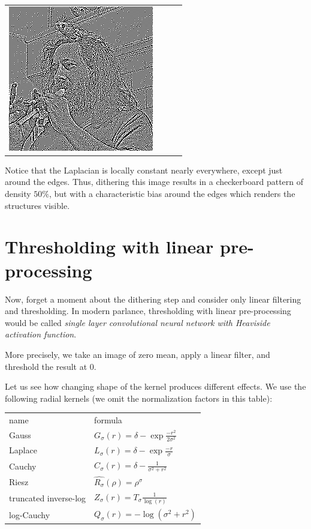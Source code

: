 \begin{tabular}{llll}
	\includegraphics{weiro-diriesz20.png} \\
\end{tabular}

Notice that the Laplacian is locally constant nearly everywhere, except just
around the edges.  Thus, dithering this image results in a checkerboard
pattern of density $50\%$, but with a characteristic bias around the edges
which renders the structures visible.


\section{Thresholding with linear pre-processing}

Now, forget a moment about the dithering step and consider only linear
filtering and thresholding.
In modern parlance, thresholding with linear pre-processing would be called
\emph{single layer convolutional neural network with Heaviside activation
function}.

More precisely, we take an image of zero mean, apply a linear filter, and
threshold the result at 0.


Let us see how changing shape of the kernel produces
different effects.  We use the following radial kernels (we omit the
normalization factors in this table):
\begin{tabular}{ll}
	name & formula \\
	Gauss & $G_\sigma(r) =\delta-\exp\frac{-r^2}{2\sigma^2}$ \\
	Laplace & $L_\sigma(r) =\delta-\exp\frac{-r}{\sigma}$ \\
	Cauchy & $C_\sigma(r) =\delta-\frac{1}{\sigma^2+r^2}$ \\
	Riesz & $\widehat{R_\sigma}(\rho)=\rho^\sigma$ \\
	truncated inverse-log & $Z_\sigma(r)=T_\sigma\frac{1}{\log(r)}$\\
	log-Cauchy & $Q_\sigma(r)=-\log(\sigma^2+r^2)$ \\
\end{tabular}

